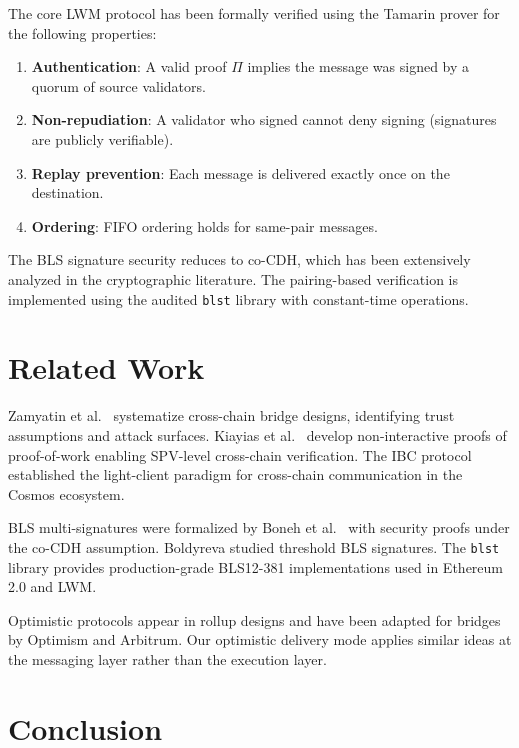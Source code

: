 \documentclass[11pt,a4paper]{article}
\begin{document}
The core LWM protocol has been formally verified using the Tamarin prover for the following properties:

\begin{enumerate}
    \item \textbf{Authentication}: A valid proof $\Pi$ implies the message was signed by a quorum of source validators.
    \item \textbf{Non-repudiation}: A validator who signed cannot deny signing (signatures are publicly verifiable).
    \item \textbf{Replay prevention}: Each message is delivered exactly once on the destination.
    \item \textbf{Ordering}: FIFO ordering holds for same-pair messages.
\end{enumerate}

The BLS signature security reduces to co-CDH, which has been extensively analyzed in the cryptographic literature. The pairing-based verification is implemented using the audited \texttt{blst} library with constant-time operations.

\section{Related Work}\label{sec:related}

Zamyatin et al.\ \cite{zamyatin2021bridge} systematize cross-chain bridge designs, identifying trust assumptions and attack surfaces. Kiayias et al.\ \cite{kiayias2016proofs} develop non-interactive proofs of proof-of-work enabling SPV-level cross-chain verification. The IBC protocol \cite{goes2020ibc} established the light-client paradigm for cross-chain communication in the Cosmos ecosystem.

BLS multi-signatures were formalized by Boneh et al.\ \cite{boneh2018compact} with security proofs under the co-CDH assumption. Boldyreva \cite{boldyreva2003threshold} studied threshold BLS signatures. The \texttt{blst} library \cite{bowe2017bls12381} provides production-grade BLS12-381 implementations used in Ethereum 2.0 and LWM.

Optimistic protocols appear in rollup designs \cite{kalodner2018arbitrum, buterin2020rollup} and have been adapted for bridges by Optimism and Arbitrum. Our optimistic delivery mode applies similar ideas at the messaging layer rather than the execution layer.

\section{Conclusion}\label{sec:conclusion}
\end{document}
